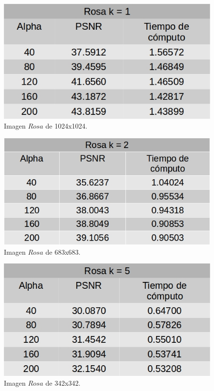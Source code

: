 \documentclass[a4paper]{article}
\begin{document}
    \begin{figure}[H]
    \centering
    \includegraphics[scale=0.4]{imagenes/rosa1.jpg}
    \caption{Imagen $Rosa$ de 1024x1024.}
	\label{rosa1}
    \end{figure}
    
    \begin{figure}[H]
    \centering
    \includegraphics[scale=0.4]{imagenes/rosa2.jpg}
    \caption{Imagen $Rosa$ de 683x683.}
	\label{rosa2}
    \end{figure}
    
    \begin{figure}[H]
    \centering
    \includegraphics[scale=0.4]{imagenes/rosa5.jpg}
    \caption{Imagen $Rosa$ de 342x342.}
	\label{rosa3}
    \end{figure}    
    
\end{document}

